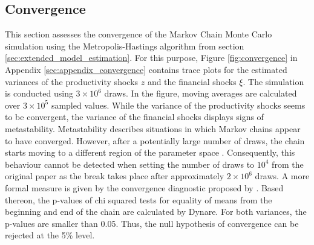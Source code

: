 

\subsection{Convergence}
\label{sec:convergence}

This section assesses the convergence of the Markov Chain Monte Carlo simulation using the Metropolis-Hastings algorithm from section \ref{sec:extended_model_estimation}. For this purpose, Figure \ref{fig:convergence} in Appendix \ref{sec:appendix_convergence} contains trace plots for the estimated variances of the productivity shocks $z$ and the financial shocks $\xi$. The simulation is conducted using $3\times10^{6}$ draws. In the figure, moving averages are calculated over $3\times10^{5}$ sampled values. While the variance of the productivity shocks seems to be convergent, the variance of the financial shocks displays signs of metastability. Metastability describes situations in which Markov chains appear to have converged. However, after a potentially large number of draws, the chain starts moving to a different region of the parameter space \citep{PATILpymc}. Consequently, this behaviour cannot be detected when setting the number of draws to $10^{4}$ from the original paper as the break takes place after approximately $2\times10^{6}$ draws. A more formal measure is given by the convergence diagnostic proposed by \cite{GEWEKEevaluating}. Based thereon, the p-values of chi squared tests for equality of means from the beginning and end of the chain are calculated by Dynare. For both variances, the p-values are smaller than 0.05. Thus, the null hypothesis of convergence can be rejected at the 5\% level.
